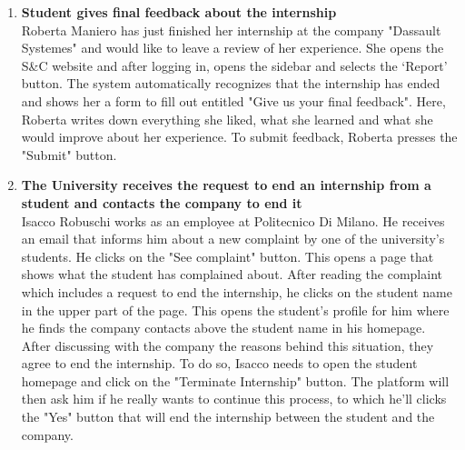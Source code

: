 \begin{enumerate}
      \item \textbf{Student gives final feedback about the internship}\\
      Roberta Maniero has just finished her internship at the company "Dassault Systemes" and would like to leave a review of her experience. She opens the S\&C website and after logging in, opens the sidebar and selects the ‘Report’ button.
      The system automatically recognizes that the internship has ended and shows her a form to fill out entitled "Give us your final feedback". Here, Roberta writes down everything she liked, what she learned and what she would improve about her experience. To submit feedback, Roberta presses the "Submit" button.


      \item \textbf{The University receives the request to end an internship from a student and contacts the company to end it}\\
      Isacco Robuschi works as an employee at Politecnico Di Milano. He receives an email that informs him about a new complaint by one of the university's students. He clicks on the "See complaint" button. This opens a page that shows what the student has complained about. After reading the complaint which includes a request to end the internship, he clicks on the student name in the upper part of the page. This opens the student's profile for him where he finds the company contacts above the student name in his homepage. After discussing with the company the reasons behind this situation, they agree to end the internship. To do so, Isacco needs to open the student homepage and click on the "Terminate Internship" button. The platform will then ask him if he really wants to continue this process, to which he'll clicks the "Yes" button that will end the internship between the student and the company.      


\end{enumerate}
